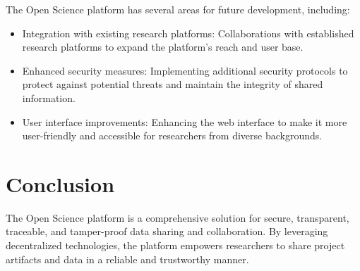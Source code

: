 \documentclass{article}
\begin{document}
The Open Science platform has several areas for future development, including:

\begin{itemize}
      \item Integration with existing research platforms: Collaborations with established research platforms to expand the platform's reach and user base.
      \item Enhanced security measures: Implementing additional security protocols to protect against potential threats and maintain the integrity of shared information.
      \item User interface improvements: Enhancing the web interface to make it more user-friendly and accessible for researchers from diverse backgrounds.
\end{itemize}

\section{Conclusion}
The Open Science platform is a comprehensive solution for secure, transparent, traceable, and tamper-proof data sharing and collaboration. By leveraging decentralized technologies, the platform empowers researchers to share project artifacts and data in a reliable and trustworthy manner.
\end{document}
